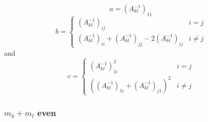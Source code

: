 \documentclass[12pt,doublespace]{article}
\begin{document}
\begin{equation}
a=\left( A_{kl}^{-1}\right) _{11}
\end{equation}
\begin{equation}
b=\left\{ 
\begin{array}{ll}
\left( A_{kl}^{-1}\right) _{ij} & i=j \\ 
\left( A_{kl}^{-1}\right) _{ii}+\left( A_{kl}^{-1}\right) _{jj}-2\left(
A_{kl}^{-1}\right) _{ij} & i\neq j
\end{array}
\right.
\end{equation}
and 
\begin{equation}
c=\left\{ 
\begin{array}{ll}
\left( A_{kl}^{-1}\right) _{1i}^{2} & i=j \\ 
\left( \left( A_{kl}^{-1}\right) _{1i}+\left( A_{kl}^{-1}\right)
_{j1}\right) ^{2} & i\neq j
\end{array}
\right.
\end{equation}

\subsubsection{$m_{k}+m_{l}$ even}
\end{document}
